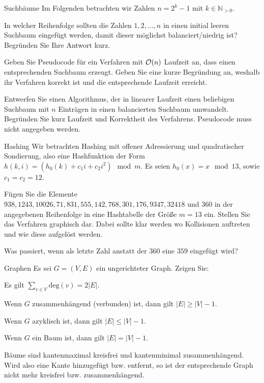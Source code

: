 \documentclass{exercisesheet}
\begin{document}
\begin{eexercises}{Suchbäume}{
    Im Folgenden betrachten wir Zahlen $n = 2^k - 1$ mit $k \in \mathbb{N}_{>0}$.
  }
  \item In welcher Reihenfolge sollten die Zahlen $1, 2, \ldots, n$ in einen initial leeren Suchbaum eingefügt werden, damit dieser möglichst balanciert/niedrig ist? Begründen Sie Ihre Antwort kurz.
  \item Geben Sie Pseudocode für ein Verfahren mit $\mathcal{O}(n)$ Laufzeit an, dass einen entsprechenden Suchbaum erzeugt. Geben Sie eine kurze Begründung an, weshalb ihr Verfahren korrekt ist und die entsprechende Laufzeit erreicht.
  \item Entwerfen Sie einen Algorithmus, der in linearer Laufzeit einen beliebigen Suchbaum mit $n$ Einträgen in einen balancierten Suchbaum umwandelt. Begründen Sie kurz Laufzeit und Korrektheit des Verfahrens. Pseudocode muss nicht angegeben werden.
\end{eexercises}

\begin{eexercises}{Hashing}{
    Wir betrachten Hashing mit offener Adressierung und quadratischer Sondierung, also eine Hashfunktion der Form $h(k, i) = (h_0(k) + c_1i + c_2i^2) \mod m$. Es seien $h_0(x) = x \mod 13$, sowie $c_1 = c_2 = 12$.
  }
  \item Fügen Sie die Elemente $938, 1243, 10026, 71, 831, 555, 142, 768, 301, 176, 9347, 32418$ und $360$ in der angegebenen Reihenfolge in eine Hashtabelle der Größe $m = 13$ ein. Stellen Sie das Verfahren graphisch dar. Dabei sollte klar werden wo Kollisionen auftreten und wie diese aufgelöst werden.
  \item Was passiert, wenn als letzte Zahl anstatt der $360$ eine $359$ eingefügt wird?
\end{eexercises}

\begin{eexercises}{Graphen}{
    Es sei $G = (V, E)$ ein ungerichteter Graph. Zeigen Sie:
  }
  \item Es gilt $\sum_{v \in V} \text{deg}(v) = 2|E|$.
  \item Wenn $G$ zusammenhängend (verbunden) ist, dann gilt $|E| \geq |V| - 1$.
  \item Wenn $G$ azyklisch ist, dann gilt $|E| \leq |V| - 1$.
  \item Wenn $G$ ein Baum ist, dann gilt $|E| = |V| - 1$.
  \item Bäume sind kantenmaximal kreisfrei und kantenminimal zusammenhängend. Wird also eine Kante hinzugefügt bzw. entfernt, so ist der entsprechende Graph nicht mehr kreisfrei bzw. zusammenhängend.
\end{eexercises}
\end{document}
